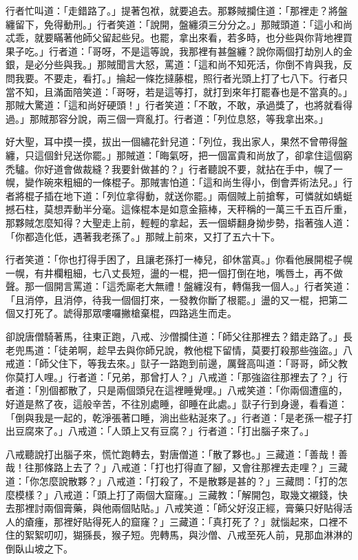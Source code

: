 行者忙叫道：「走錯路了。」提著包袱，就要追去。那夥賊攔住道：「那裡走？將盤纏留下，免得動刑。」行者笑道：「說開，盤纏須三分分之。」那賊頭道：「這小和尚忒乖，就要瞞著他師父留起些兒。也罷，拿出來看，若多時，也分些與你背地裡買果子吃。」行者道：「哥呀，不是這等說，我那裡有甚盤纏？說你兩個打劫別人的金銀，是必分些與我。」那賊聞言大怒，罵道：「這和尚不知死活，你倒不肯與我，反問我要。不要走，看打。」掄起一條扢撻藤棍，照行者光頭上打了七八下。行者只當不知，且滿面陪笑道：「哥呀，若是這等打，就打到來年打罷春也是不當真的。」那賊大驚道：「這和尚好硬頭！」行者笑道：「不敢，不敢，承過獎了，也將就看得過。」那賊那容分說，兩三個一齊亂打。行者道：「列位息怒，等我拿出來。」

好大聖，耳中摸一摸，拔出一個繡花針兒道：「列位，我出家人，果然不曾帶得盤纏，只這個針兒送你罷。」那賊道：「晦氣呀，把一個富貴和尚放了，卻拿住這個窮禿驢。你好道會做裁縫？我要針做甚的？」行者聽說不要，就拈在手中，幌了一幌，變作碗來粗細的一條棍子。那賊害怕道：「這和尚生得小，倒會弄術法兒。」行者將棍子插在地下道：「列位拿得動，就送你罷。」兩個賊上前搶奪，可憐就如蜻蜓撼石柱，莫想弄動半分毫。這條棍本是如意金箍棒，天秤稱的一萬三千五百斤重，那夥賊怎麼知得？大聖走上前，輕輕的拿起，丟一個蟒翻身拗步勢，指著強人道：「你都造化低，遇著我老孫了。」那賊上前來，又打了五六十下。

行者笑道：「你也打得手困了，且讓老孫打一棒兒，卻休當真。」你看他展開棍子幌一幌，有井欄粗細，七八丈長短，盪的一棍，把一個打倒在地，嘴唇土，再不做聲。那一個開言罵道：「這禿廝老大無禮！盤纏沒有，轉傷我一個人。」行者笑道：「且消停，且消停，待我一個個打來，一發教你斷了根罷。」盪的又一棍，把第二個又打死了。諕得那眾嘍囉撇槍棄棍，四路逃生而走。

卻說唐僧騎著馬，往東正跑，八戒、沙僧攔住道：「師父往那裡去？錯走路了。」長老兜馬道：「徒弟啊，趁早去與你師兄說，教他棍下留情，莫要打殺那些強盜。」八戒道：「師父住下，等我去來。」獃子一路跑到前邊，厲聲高叫道：「哥哥，師父教你莫打人哩。」行者道：「兄弟，那曾打人？」八戒道：「那強盜往那裡去了？」行者道：「別個都散了，只是兩個頭兒在這裡睡覺哩。」八戒笑道：「你兩個遭瘟的，好道是熬了夜，這般辛苦，不往別處睡，卻睡在此處。」獃子行到身邊，看看道：「倒與我是一起的，乾淨張著口睡，淌出些粘涎來了。」行者道：「是老孫一棍子打出豆腐來了。」八戒道：「人頭上又有豆腐？」行者道：「打出腦子來了。」

八戒聽說打出腦子來，慌忙跑轉去，對唐僧道：「散了夥也。」三藏道：「善哉！善哉！往那條路上去了？」八戒道：「打也打得直了腳，又會往那裡去走哩？」三藏道：「你怎麼說散夥？」八戒道：「打殺了，不是散夥是甚的？」三藏問：「打的怎麼模樣？」八戒道：「頭上打了兩個大窟窿。」三藏教：「解開包，取幾文襯錢，快去那裡討兩個膏藥，與他兩個貼貼。」八戒笑道：「師父好沒正經，膏藥只好貼得活人的瘡瘇，那裡好貼得死人的窟窿？」三藏道：「真打死了？」就惱起來，口裡不住的絮絮叨叨，猢猻長，猴子短。兜轉馬，與沙僧、八戒至死人前，見那血淋淋的倒臥山坡之下。


